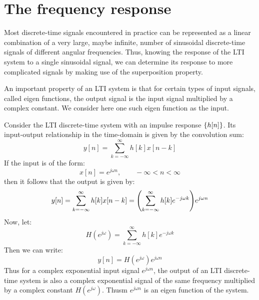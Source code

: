 \documentclass[../../main/main.tex]{subfiles}
\begin{document}
\section{The frequency response}
Most discrete-time signals encountered in practice can be represented as a linear combination of a very large, maybe infinite, number of sinusoidal discrete-time signals of different angular frequencies. Thus, knowing the response of the LTI system to a single sinusoidal signal, we can determine its response to more complicated signals by making use of the superposition property.

An important property of an LTI system is that for certain types of input signals, called eigen functions, the output signal is the input signal multiplied by a complex constant. We consider here one such eigen function as the input.

Consider the LTI discrete-time system with an impulse response \( \qty{h[n]} \). Its input-output relationship in the time-domain is given by the convolution sum:
\begin{equation}
    y[n]
    =
    \sum_{k=-\infty}^{\infty} h[k] x[n-k]
    \label{eq:L09_S32_1}
\end{equation}
If the input is of the form:
\begin{equation}
    x[n]
    =
    e^{j\omega n},
    \qquad
    -\infty < n < \infty
    \label{eq:L09_S33_1}
\end{equation}
then it follows that the output is given by:
\begin{equation}
    y[n]
    =
    \sum_{k=-\infty}^{\infty} h[k] x[n-k]
    =
    \qty( \sum_{k=-\infty}^{\infty} h[k]e^{-j\omega k} ) e^{j\omega n}
    \label{eq:L09_S33_2}
\end{equation}
Now, let:
\begin{equation}
    H(e^{j\omega})
    =
    \sum_{k=-\infty}^{\infty} h[k]e^{-j\omega k}
    \label{eq:L09_S33_3}
\end{equation}
Then we can write:
\begin{equation}
    y[n]
    =
    H(e^{j\omega}) e^{j\omega n}
    \label{eq:L09_S34_1}
\end{equation}
Thus for a complex exponential input signal \( e^{j\omega n} \), the output of an LTI discrete-time system is also a complex exponential signal of the same frequency multiplied by a complex constant \( H(e^{j\omega}) \). Thusm \( e^{j\omega n} \) is an eigen function of the system.
\end{document}
